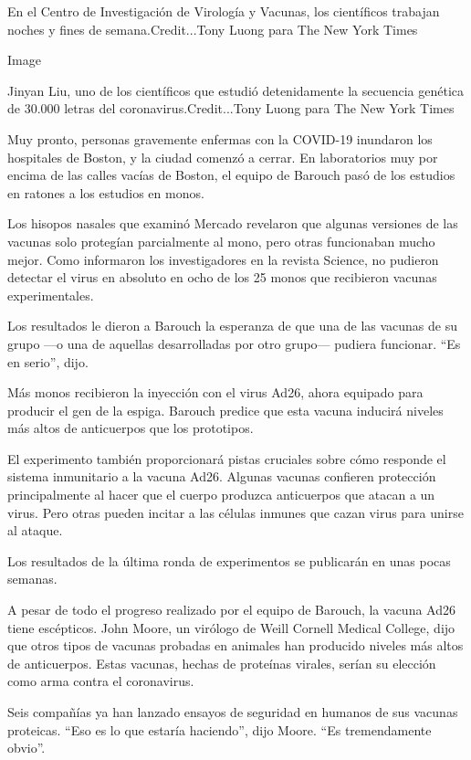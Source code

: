 En el Centro de Investigación de Virología y Vacunas, los científicos
trabajan noches y fines de semana.Credit...Tony Luong para The New York
Times

Image

Jinyan Liu, uno de los científicos que estudió detenidamente la
secuencia genética de 30.000 letras del coronavirus.Credit...Tony Luong
para The New York Times

Muy pronto, personas gravemente enfermas con la COVID-19 inundaron los
hospitales de Boston, y la ciudad comenzó a cerrar. En laboratorios muy
por encima de las calles vacías de Boston, el equipo de Barouch pasó de
los estudios en ratones a los estudios en monos.

Los hisopos nasales que examinó Mercado revelaron que algunas versiones
de las vacunas solo protegían parcialmente al mono, pero otras
funcionaban mucho mejor. Como informaron los investigadores en la
revista Science, no pudieron detectar el virus en absoluto en ocho de
los 25 monos que recibieron vacunas experimentales.

Los resultados le dieron a Barouch la esperanza de que una de las
vacunas de su grupo ---o una de aquellas desarrolladas por otro grupo---
pudiera funcionar. ``Es en serio'', dijo.

Más monos recibieron la inyección con el virus Ad26, ahora equipado para
producir el gen de la espiga. Barouch predice que esta vacuna inducirá
niveles más altos de anticuerpos que los prototipos.

El experimento también proporcionará pistas cruciales sobre cómo
responde el sistema inmunitario a la vacuna Ad26. Algunas vacunas
confieren protección principalmente al hacer que el cuerpo produzca
anticuerpos que atacan a un virus. Pero otras pueden incitar a las
células inmunes que cazan virus para unirse al ataque.

Los resultados de la última ronda de experimentos se publicarán en unas
pocas semanas.

A pesar de todo el progreso realizado por el equipo de Barouch, la
vacuna Ad26 tiene escépticos. John Moore, un virólogo de Weill Cornell
Medical College, dijo que otros tipos de vacunas probadas en animales
han producido niveles más altos de anticuerpos. Estas vacunas, hechas de
proteínas virales, serían su elección como arma contra el coronavirus.

Seis compañías ya han lanzado ensayos de seguridad en humanos de sus
vacunas proteicas. ``Eso es lo que estaría haciendo'', dijo Moore. ``Es
tremendamente obvio''.

